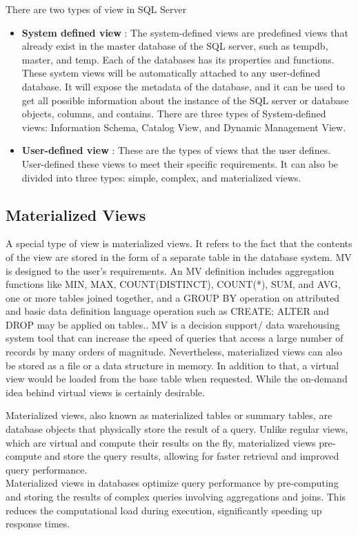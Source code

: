 There are two types of view in SQL Server
\begin{itemize}
    \item \textbf{System defined view }: The system-defined views are predefined views that already exist in the master database of the SQL server, such as tempdb, master, and temp. Each of the databases has its properties and functions. These system views will be automatically attached to any user-defined database. It will expose the metadata of the database, and it can be used to get all possible information about the instance of the SQL server or database objects, columns, and contains. There are three types of System-defined views: Information Schema, Catalog View, and Dynamic Management View. \cite{chauhan-2024}
    \item \textbf{User-defined view }: These are the types of views that the user defines. User-defined these views to meet their specific requirements. It can also be divided into three types: simple, complex, and materialized views.\cite{javapoint-author-2024}
\end{itemize}
   
\subsection{Materialized Views}
 A special type of view is materialized views. It refers to the fact that the contents of the view are stored in the form of a separate table in the database system. MV is designed to the user's requirements. An MV definition includes aggregation functions like MIN, MAX, COUNT(DISTINCT), COUNT(*), SUM, and AVG, one or more tables joined together, and a GROUP BY operation on attributed and basic data definition language operation such as CREATE; ALTER and DROP may be applied on tables.\cite{Kardel_Thakare}. MV is a decision support/ data warehousing system tool that can increase the speed of queries that access a large number of records by many orders of magnitude.\cite{Kishan_Sainath_no_date} Nevertheless, materialized views can also be stored as a file or a data structure in memory. In addition to that, a virtual view would be loaded from the base table when requested. While the on-demand idea behind virtual views is certainly desirable.\cite{jan-no-date,ashadevi-2024}

\begin{definition}
Materialized views, also known as materialized tables or summary tables, are database objects that physically store the result of a query. Unlike regular views, which are virtual and compute their results on the fly, materialized views pre-compute and store the query results, allowing for faster retrieval and improved query performance.\\
Materialized views in databases optimize query performance by pre-computing and storing the results of complex queries involving aggregations and joins. This reduces the computational load during execution, significantly speeding up response times.

\end{definition}

